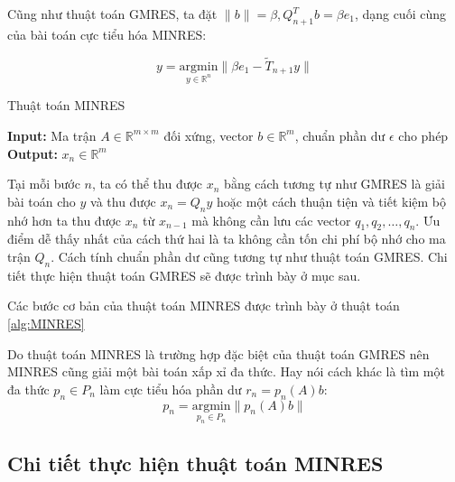 \documentclass[14pt, a4paper]{article}
\numberwithin{equation}{section}
\numberwithin{algorithm}{section}
\numberwithin{figure}{section}
\numberwithin{dl}{section}
\numberwithin{md}{section}
\numberwithin{bd}{section}
\numberwithin{dn}{section}
\begin{document}
Cũng như thuật toán GMRES, ta đặt $\lVert b \rVert= \beta, Q_{n+1}^T b=\beta e_1$, dạng cuối cùng của bài toán cực tiểu hóa MINRES:

\begin{equation}
    y = \underset{y \in \mathbb{R}^n}{\mathrm{argmin}} \lVert \beta e_1 - \widetilde{T}_{n+1} y \rVert 
\end{equation}



\begin{algorithm}[h!]
    \caption{Thuật toán MINRES}\label{alg:MINRES}
    \hspace*{\algorithmicindent} \textbf{Input:} {Ma trận $A \in \mathbb{R}^{m \times m}$ đối xứng, vector $b \in \mathbb{R}^m$, chuẩn phần dư $\epsilon$ cho phép} \\
    \hspace*{\algorithmicindent} \textbf{Output:} {$x_n \in \mathbb{R}^m$}
    \begin{algorithmic}
        \EndFor
    \end{algorithmic}
\end{algorithm}

Tại mỗi bước $n$, ta có thể thu được $x_n$ bằng cách tương tự như GMRES là giải bài toán cho $y$ và thu được $x_n = Q_n y$ hoặc một cách thuận tiện và tiết kiệm bộ nhớ hơn ta thu được $x_n$ từ $x_{n-1}$ mà không cần lưu các vector $q_1, q_2, \dots, q_n$. Ưu điểm dễ thấy nhất của cách thứ hai là ta không cần tốn chi phí bộ nhớ cho ma trận $Q_n$.
Cách tính chuẩn phần dư cũng tương tự như thuật toán GMRES. Chi tiết thực hiện thuật toán GMRES sẽ được trình bày ở mục sau.

Các bước cơ bản của thuật toán MINRES được trình bày ở thuật toán \ref{alg:MINRES}

Do thuật toán MINRES là trường hợp đặc biệt của thuật toán GMRES nên MINRES cũng giải một bài toán xấp xỉ đa thức. Hay nói cách khác là tìm một đa thức $p_n \in P_n$ làm cực tiểu hóa phần dư $r_n = p_n(A)b$:
\begin{equation}
    p_n = \underset{p_n \in P_n}{\mathrm{argmin}} \lVert p_n(A)b \rVert
\end{equation}

\subsection{Chi tiết thực hiện thuật toán MINRES}
\end{document}
